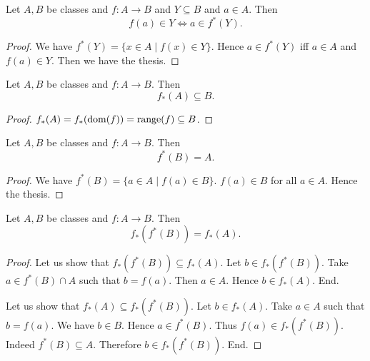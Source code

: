 \documentclass[../../set-theory/set-theory.tex]{subfiles}
\begin{document}
  \begin{forthel}
    \begin{proposition}
      Let $A, B$ be classes and $f : A \to B$ and $Y \subseteq B$ and $a \in A$.
      Then \[ f(a) \in Y \iff a \in f^{*}(Y). \]
    \end{proposition}
    \begin{proof}
      We have $f^{*}(Y) = \{ x \in A \mid f(x) \in Y \}$.
      Hence $a \in f^{*}(Y)$ iff $a \in A$ and $f(a) \in Y$.
      Then we have the thesis.
    \end{proof}
  \end{forthel}

  \begin{forthel}
    \begin{proposition}
      Let $A, B$ be classes and $f : A \to B$.
      Then \[ f_{*}(A) \subseteq B. \]
    \end{proposition}
    \begin{proof}
      $f_{*}(A) = f_{*}(\operatorname{dom}(f)) = \operatorname{range}(f) \subseteq B$.
    \end{proof}
  \end{forthel}

  \begin{forthel}
    \begin{proposition}
      Let $A, B$ be classes and $f : A \to B$.
      Then \[ f^{*}(B) = A. \]
    \end{proposition}
    \begin{proof}
      We have $f^{*}(B) = \{ a \in A \mid f(a) \in B \}$.
      $f(a) \in B$ for all $a \in A$.
      Hence the thesis.
    \end{proof}
  \end{forthel}

  \begin{forthel}
    \begin{proposition}
      Let $A, B$ be classes and $f : A \to B$.
      Then \[ f_{*}(f^{*}(B)) = f_{*}(A). \]
    \end{proposition}
    \begin{proof}
      Let us show that $f_{*}(f^{*}(B)) \subseteq f_{*}(A)$.
        Let $b \in f_{*}(f^{*}(B))$.
        Take $a \in f^{*}(B) \cap A$ such that $b = f(a)$.
        Then $a \in A$.
        Hence $b \in f_{*}(A)$.
      End.

      Let us show that $f_{*}(A) \subseteq f_{*}(f^{*}(B))$.
        Let $b \in f_{*}(A)$.
        Take $a \in A$ such that $b = f(a)$.
        We have $b \in B$.
        Hence $a \in f^{*}(B)$.
        Thus $f(a) \in f_{*}(f^{*}(B))$.
        Indeed $f^{*}(B) \subseteq A$.
        Therefore $b \in f_{*}(f^{*}(B))$.
      End.
    \end{proof}
  \end{forthel}
\end{document}
